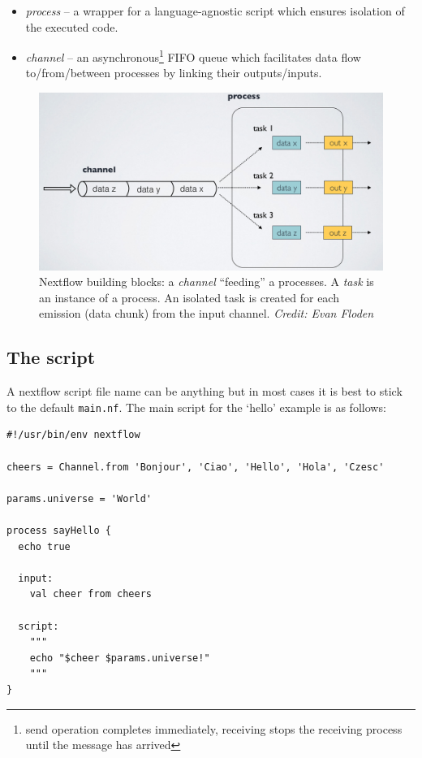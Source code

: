 \begin{itemize}
\item \emph{process} -- a wrapper for a language-agnostic script which ensures isolation of the executed code.
\item \emph{channel} -- an asynchronous\footnote{send operation completes immediately, receiving stops the receiving process until the message has arrived} FIFO queue which facilitates data flow to/from/between processes by linking their outputs/inputs.
\end{itemize}


\begin{figure}[H]
\centering
\includegraphics[width=.8\textwidth]{handout/channel-process.png}
\caption{Nextflow building blocks: a \emph{channel} ``feeding'' a processes. 
A \emph{task} is an instance of a process. An isolated task is created for each emission (data chunk) from the input channel. \emph{Credit: Evan Floden}}
\label{fig:proc-chn}
\end{figure}


\subsection{The script}

A nextflow script file name can be anything but in most cases it is best to stick to the default \texttt{main.nf}. 
The main script for the `hello' example is as follows:


\begin{lstlisting}
#!/usr/bin/env nextflow

cheers = Channel.from 'Bonjour', 'Ciao', 'Hello', 'Hola', 'Czesc'

params.universe = 'World'

process sayHello {
  echo true

  input:
    val cheer from cheers
    
  script:
    """
    echo "$cheer $params.universe!"
    """
}
\end{lstlisting}


